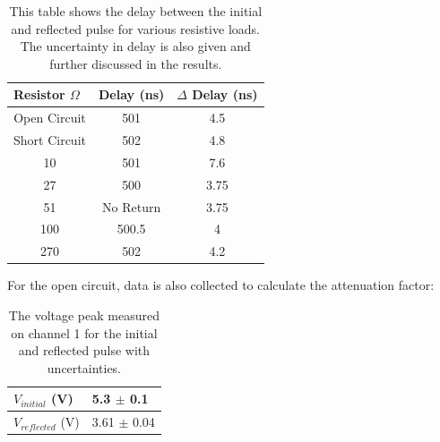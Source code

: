 \documentclass[12pt]{article}
\begin{document}
\begin{table}[H]
    \begin{tabular}{|c|c|c|}
    \hline
    \multicolumn{1}{|l|}{Resistor $\Omega$} & \multicolumn{1}{l|}{Delay (ns)} & \multicolumn{1}{l|}{$\Delta$ Delay (ns)} \\ \hline
    Open Circuit                                           & 501                             & 4.5                                                   \\ \hline
    Short Circuit                                          & 502                             & 4.8                                                   \\ \hline
    10                                                     & 501                             & 7.6                                                   \\ \hline
    27                                                     & 500                             & 3.75                                                  \\ \hline
    51                                                     & No Return                       & 3.75                                                  \\ \hline
    100                                                    & 500.5                           & 4                                                     \\ \hline
    270                                                    & 502                             & 4.2                                                   \\ \hline
    \end{tabular}
    \centering
    \label{Tab:part2_a}
    \caption{This table shows the delay between the initial and reflected pulse for various resistive loads. The uncertainty in delay is also given and further discussed in the results.}
\end{table}

For the open circuit, data is also collected to calculate the attenuation factor:
\begin{table}[H]
    \begin{tabular}{|l|l|}
    \hline
    $V_{initial}$ (V)   & 5.3 $\pm$ 0.1   \\ \hline
    $V_{reflected}$ (V) & 3.61 $\pm$ 0.04 \\ \hline
    \end{tabular}
    \centering
    \label{Tab:part2_b}
    \caption{The voltage peak measured on channel 1 for the initial and reflected pulse with uncertainties.}
\end{table}
\end{document}
